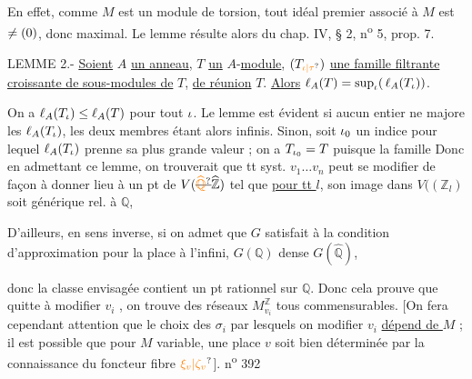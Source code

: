 En effet, comme $M$ est un module de torsion, tout idéal premier associé à $M$ est $\ne(0)$, donc maximal. Le lemme résulte alors du chap. IV, § 2, n\textsuperscript{o} 5, prop. 7.

LEMME 2.- \uline{Soient} $A$ \uline{un anneau}, $T$ \uline{un} $A$-\uline{module}, $(T_{\handwritten{\unsure{\iota|\tau}}})$ \uline{une famille filtrante croissante de sous-modules de} $T$, \uline{de réunion} $T$. \uline{Alors} $\ell_A(T)=\sup_{\iota}(\,\ell_A(T_{\iota}))$.

On a $\ell_A(T_{\iota})\leq\ell_A(T)$ pour tout $\iota$. Le lemme est évident si aucun entier ne majore les $\ell_A(T_{\iota})$, les deux membres étant alors infinis. Sinon, soit $\iota_0$ un indice pour lequel $\ell_A(T_{\iota})$ prenne sa plus grande valeur ; on a $T_{\iota_0}=T$ puisque la famille
Donc en admettant ce lemme, on trouverait que tt syst. $v_1\ldots v_n$ peut se modifier  de façon à donner lieu à un pt  de $V(\deleted{\unsure{\widehat{\mathbb Q}}}\widehat{\mathbb Z})$  tel que \uline{pour tt $l$},  son image dans $V(( \mathbb Z_l)$ soit générique rel. à $\mathbb Q$,

D'ailleurs, en sens inverse, si on admet que $G$ satisfait à la condition d'approximation pour la place à l'infini, $G(\mathbb Q)$ dense  $G(\widehat{\mathbb Q})$,

 donc la classe envisagée  contient un pt rationnel sur $\mathbb Q$. Donc cela prouve que quitte à modifier $v_i$ , on trouve des réseaux $M_{v_i}^{\mathbb Z}$ tous commensurables.
[On fera cependant attention que le choix des $\sigma_i$ par lesquels on  modifier $v_i$ \uline{dépend de $M$} ; il est possible que pour $M$ variable, une place $v$ soit bien déterminée par la connaissance du foncteur fibre $\unsure{\xi_v|\zeta_v}$].
\hfill n\textsuperscript{o} 392

